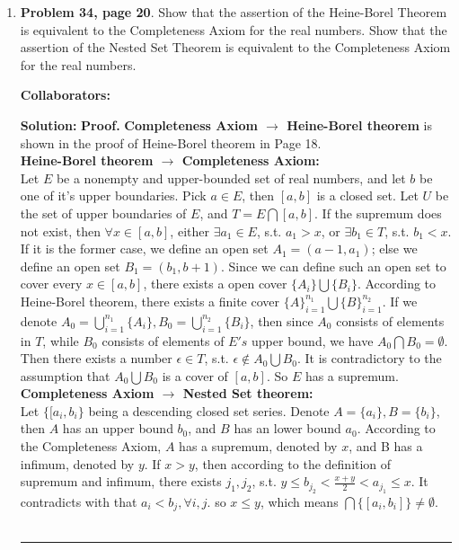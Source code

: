\documentclass{article}%
\newenvironment{proof}[1][Proof]{\textbf{#1.} }{\ \rule{0.5em}{0.5em}}
\begin{document}
\begin{enumerate}
\item \textbf{Problem 34, page 20}.  Show that the assertion of the Heine-Borel Theorem is equivalent to the Completeness Axiom for the real numbers.  Show that the assertion of the Nested Set Theorem is equivalent to the Completeness Axiom for the real numbers.

\bigskip
\textbf{Collaborators:} 
\smallskip
 
\textbf{Solution:}
\begin{proof}
\textbf{Completeness Axiom $\to$ Heine-Borel theorem} is shown in the proof of Heine-Borel theorem in Page 18.
\\[5pt]
\textbf{Heine-Borel theorem $\to$ Completeness Axiom:} \\
Let $E$ be a nonempty and upper-bounded set of real numbers, and let $b$ be one of it's upper boundaries. Pick $a\in E$, then $[a, b]$ is a closed set. Let $U$ be the set of upper boundaries of $E$, and $T = E\bigcap [a, b]$. If the supremum does not exist, then $\forall x\in[a, b]$, either $\exists a_1\in E$, s.t. $a_1 > x$, or $\exists b_1\in T$, s.t. $b_1 < x$. If it is the former case, we define an open set $A_1 = (a-1, a_1)$; else we define an open set $B_1 = (b_1, b+1)$. Since we can define such an open set to cover every $x\in [a, b]$, there exists a open cover $\{A_i\}\bigcup\{B_i\}$. According to Heine-Borel theorem, there exists a finite cover $\{A\}_{i = 1}^{n_1}\bigcup\{B\}_{i = 1}^{n_2}$. If we denote $A_0 = \bigcup_{i=1}^{n_1}\{A_i\}, B_0 = \bigcup_{i=1}^{n_2}\{B_i\}$, then since $A_0$ consists of elements in $T$, while $B_0$ consists of elements of $E's$ upper bound, we have $A_0\bigcap B_0 = \emptyset$. Then there exists a number $\epsilon\in T$, s.t. $\epsilon\notin A_0\bigcup B_0$. It is contradictory to the assumption that $A_0\bigcup B_0$ is a cover of $[a, b]$. So $E$ has a supremum. \\[5pt]
\textbf{Completeness Axiom $\to$ Nested Set theorem:} \\
Let $\{[a_i, b_i\}$ being a descending closed set series. Denote $A = \{a_i\}, B = \{b_i\}$, then $A$ has an upper bound $b_0$, and $B$ has an lower bound $a_0$. According to the Completeness Axiom, $A$ has a supremum, denoted by $x$, and B has a infimum, denoted by $y$. If $x > y$, then according to the definition of supremum and infimum, there exists $j_1, j_2$, s.t. $y \le b_{j_2} < \frac{x+y}{2} < a_{j_1} \le x$. It contradicts with that $a_i < b_j, \forall i, j$. so $x \le y$, which means $\bigcap \{[a_i, b_i]\} \ne \emptyset$. \\

\end{proof}
\end{enumerate}
\end{document}
